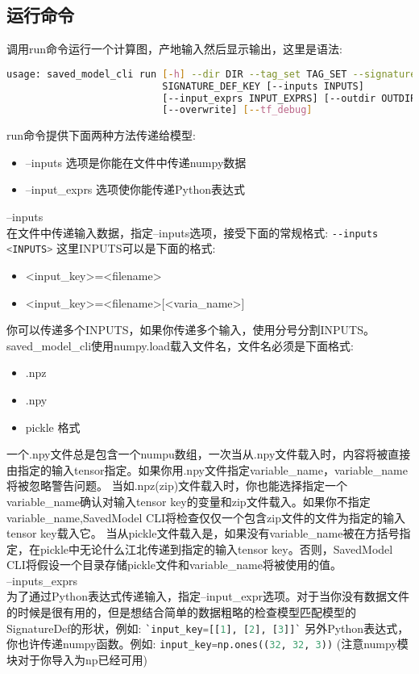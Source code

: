 \subsection{运行命令}
调用run命令运行一个计算图，产地输入然后显示输出，这里是语法:
\begin{lstlisting}[language=Bash]
usage: saved_model_cli run [-h] --dir DIR --tag_set TAG_SET --signature_def
                           SIGNATURE_DEF_KEY [--inputs INPUTS]
                           [--input_exprs INPUT_EXPRS] [--outdir OUTDIR]
                           [--overwrite] [--tf_debug]
\end{lstlisting}
run命令提供下面两种方法传递给模型:
\begin{itemize}
\item --inputs 选项是你能在文件中传递numpy数据
\item --input\_exprs 选项使你能传递Python表达式
\end{itemize}
--inputs\\
在文件中传递输入数据，指定--inputs选项，接受下面的常规格式:
\lstinline[language=Bash]{--inputs <INPUTS>}
这里INPUTS可以是下面的格式:
\begin{itemize}
\item <input\_key>=<filename> 
\item <input\_key>=<filename>[<varia\_name>]
\end{itemize}
你可以传递多个INPUTS，如果你传递多个输入，使用分号分割INPUTS。saved\_model\_cli使用numpy.load载入文件名，文件名必须是下面格式:
\begin{itemize}
\item .npz
\item .npy
\item pickle 格式
\end{itemize}
一个.npy文件总是包含一个numpu数组，一次当从.npy文件载入时，内容将被直接由指定的输入tensor指定。如果你用.npy文件指定variable\_name，variable\_name将被忽略警告问题。
当如.npz(zip)文件载入时，你也能选择指定一个variable\_name确认对输入tensor key的变量和zip文件载入。如果你不指定variable\_name,SavedModel CLI将检查仅仅一个包含zip文件的文件为指定的输入tensor key载入它。
当从pickle文件载入是，如果没有variable\_name被在方括号指定，在pickle中无论什么江北传递到指定的输入tensor key。否则，SavedModel CLI将假设一个目录存储pickle文件和variable\_name将被使用的值。\\
--inputs\_exprs\\
为了通过Python表达式传递输入，指定--input\_expr选项。对于当你没有数据文件的时候是很有用的，但是想结合简单的数据粗略的检查模型匹配模型的SignatureDef的形状，例如:
\lstinline[language=Python]{`input_key=[[1], [2], [3]]`}
另外Python表达式，你也许传递numpy函数。例如:
\lstinline[language=Python]{input_key=np.ones((32, 32, 3))}
(注意numpy模块对于你导入为np已经可用)
